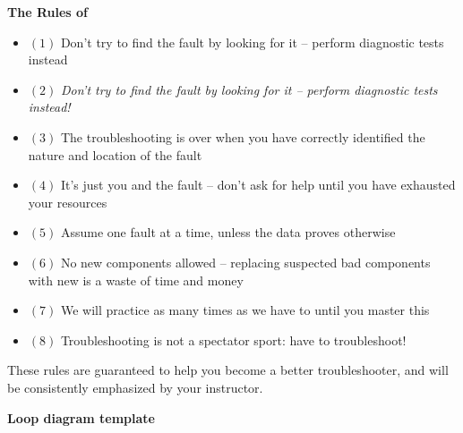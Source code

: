 

\centerline{\bf The Rules of }

\begin{itemize}
\item{$(1)$} Don't try to find the fault by looking for it -- perform diagnostic tests instead
\vskip 10pt
\item{$(2)$} {\it Don't try to find the fault by looking for it -- perform diagnostic tests instead!}
\vskip 10pt
\item{$(3)$} The troubleshooting is over when you have correctly identified the nature and location of the fault
\vskip 10pt
\item{$(4)$} It's just you and the fault -- don't ask for help until you have exhausted your resources
\vskip 10pt
\item{$(5)$} Assume one fault at a time, unless the data proves otherwise
\vskip 10pt
\item{$(6)$} No new components allowed -- replacing suspected bad components with new is a waste of time and money
\vskip 10pt
\item{$(7)$} We will practice as many times as we have to until you master this
\vskip 10pt
\item{$(8)$} Troubleshooting is not a spectator sport:  have to troubleshoot!
\end{itemize}

\vskip 10pt

These rules are guaranteed to help you become a better troubleshooter, and will be consistently emphasized by your instructor.


\filbreak

\noindent
{\bf Loop diagram template}

